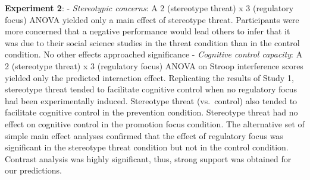 \documentclass[
  doc, a4paper]{apa7}
\begin{document}
\textbf{Experiment 2}:
- \emph{Stereotypic concerns}: A 2 (stereotype threat) x 3 (regulatory focus) ANOVA yielded only a main effect of stereotype threat. Participants were more concerned that a negative performance would lead others to infer that it was due to their social science studies in the threat condition than in the control condition. No other effects approached significance
- \emph{Cognitive control capacity}: A 2 (stereotype threat) x 3 (regulatory focus) ANOVA on Stroop interference scores yielded only the predicted interaction effect. Replicating the results of Study 1, stereotype threat tended to facilitate cognitive control when no regulatory focus had been experimentally induced. Stereotype threat (vs.~control) also tended to facilitate cognitive control in the prevention condition. Stereotype threat had no effect on cognitive control in the promotion focus condition. The alternative set of simple main effect analyses confirmed that the effect of regulatory focus was significant in the stereotype threat condition but not in the control condition. Contrast analysis was highly significant, thus, strong support was obtained for our predictions.
\end{document}

